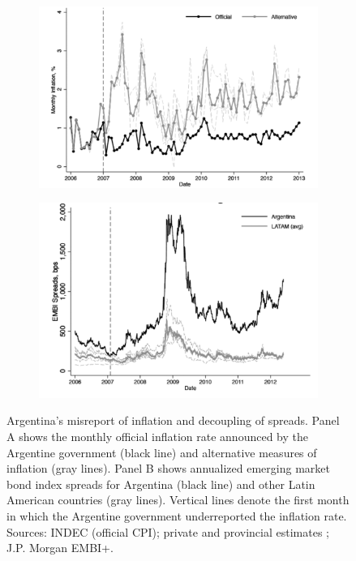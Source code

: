 \documentclass[12pt]{article}
\theoremstyle{plain}
\begin{document}
\begin{figure}[htbp]
	\centering
	\begin{subfigure}[t]{0.49\textwidth}
		\centering
		\includegraphics[width=\linewidth]{../../pro-default-model/results/inflation_arg.png}
		\label{fig:argentina_inflation}
	\end{subfigure}\hfill
	\begin{subfigure}[t]{0.49\textwidth}
		\centering
		\includegraphics[width=\linewidth]{../../pro-default-model/results/spread_arg.png}
		\label{fig:argentina_spread}
	\end{subfigure}
	\caption{Argentina’s misreport of inflation and decoupling of spreads. Panel A shows the monthly official inflation rate announced by the Argentine government (black line) and alternative measures of inflation (gray lines). Panel B shows annualized emerging market bond index spreads for Argentina (black line) and other Latin American countries (gray lines). Vertical lines denote the first month in which the Argentine government underreported the inflation rate. Sources: INDEC (official CPI); private and provincial estimates \citet{Cavallo2013}; J.P. Morgan EMBI+.}
	\label{fig:argentina_spreads}
\end{figure}
\end{document}
